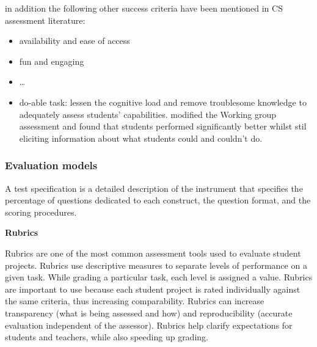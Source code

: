 in addition the following other success criteria have been mentioned in CS assessment literature:
\begin{itemize}
\item availability and ease of access \cite{Yadav2015}
\item fun and engaging 
\item \ldots {}
\item do-able task: lessen the cognitive load and remove troublesome knowledge to adequately assess students' capabilities.  modified the \citeauthor{McCracken2001} Working group assessment and found that students performed significantly better whilst stil eliciting information about what students could and couldn't do.


\end{itemize}

%




\subsubsection*{Evaluation models}\label{sec:evaluationModels}
A test specification is a detailed description of the instrument that specifies the percentage of questions dedicated to each construct, the question format, and the scoring procedures.

\noindent \textbf{Rubrics}


Rubrics are one of the most common assessment tools used to evaluate student projects. Rubrics use descriptive measures to separate levels of performance on a given task. While grading a particular task, each level is assigned a value. Rubrics are important to use because each student project is rated individually against the same criteria, thus increasing comparability. Rubrics can increase transparency (what is being assessed and how) and reproducibility (accurate evaluation independent of the assessor). Rubrics help clarify expectations for students and teachers, while also speeding up grading\cite{catete2017framework}.



